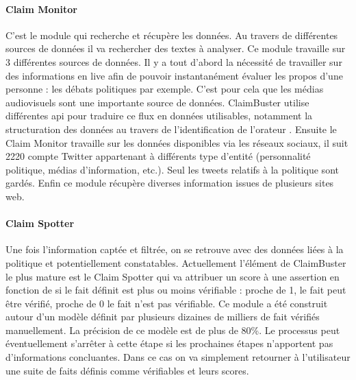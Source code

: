 \paragraph{Claim Monitor}

C'est le module qui recherche et récupère les données. Au travers de différentes sources de données il va rechercher des textes à analyser. Ce module travaille sur 3 différentes sources de données. Il y a tout d'abord la nécessité de travailler sur des informations en live afin de pouvoir instantanément évaluer les propos d'une personne : les débats politiques par exemple. C'est pour cela que les médias audiovisuels sont une importante source de données. ClaimBuster utilise différentes api pour traduire ce flux en données utilisables, notamment la structuration des données au travers de l'identification de l'orateur \cite{joseph2015speaker}. Ensuite le Claim Monitor travaille sur les données disponibles via les réseaux sociaux, il suit 2220 compte Twitter appartenant à différents type d'entité (personnalité politique, médias d'information, etc.). Seul les tweets relatifs à la politique sont gardés. Enfin ce module récupère diverses information issues de plusieurs sites web.

\paragraph{Claim Spotter}

Une fois l'information captée et filtrée, on se retrouve avec des données liées à la politique et potentiellement constatables. Actuellement l'élément de ClaimBuster le plus mature est le Claim Spotter qui va attribuer un score à une assertion en fonction de si le fait définit est plus ou moins vérifiable : proche de 1, le fait peut être vérifié, proche de 0 le fait n'est pas vérifiable. Ce module a été construit autour d'un modèle définit par plusieurs dizaines de milliers de fait vérifiés manuellement. La précision de ce modèle est de plus de 80\%.  Le processus peut éventuellement s'arrêter à cette étape si les prochaines étapes n'apportent pas d'informations concluantes. Dans ce cas on va simplement retourner à l'utilisateur une suite de faits définis comme vérifiables et leurs scores.

